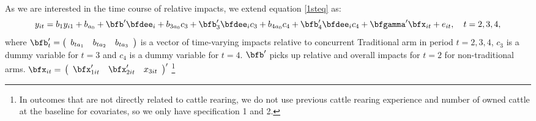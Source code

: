 	As we are interested in the time course of relative impacts, we extend equation \eqref{1steq} as:
	\begin{equation}
	y_{it}=b_{1}y_{i1}+b_{a_{0}}+\bfb'_{}\bfdee_{i}+b_{3a_{0}}c_{3}+\bfb'_{3}\bfdee_{i}c_{3}+b_{4a_{0}}c_{4}+\bfb'_{4}\bfdee_{i}c_{4}+\bfgamma'\bfx_{it}+e_{it}, \quad t=2, 3, 4,
	\label{EstimatingEqTimeVarying}
	\end{equation}
	where $\bfb'_{t}=\left(
	\begin{array}{ccc}
	b_{ta_{1}} & b_{ta_{2}} & b_{ta_{3}}
	\end{array}
	\right)$ is a vector of time-varying impacts relative to concurrent \textsf{Traditional} arm in period $t=2, 3, 4$, $c_{3}$ is a dummy variable for $t=3$ and $c_{4}$ is a dummy variable for $t=4$. $\bfb'_{}$ picks up relative and overall impacts for $t=2$ for non-traditional arms. $\bfx_{it}=$ $\left(
	\begin{array}{ccc}
	\bfx'_{1it} & \bfx'_{2it} & x_{3it}
	\end{array}
	\right)'$ \footnote{In outcomes that are not directly related to cattle rearing, we do not use previous cattle rearing experience and number of owned cattle at the baseline for covariates, so we only have specification 1 and 2. }




